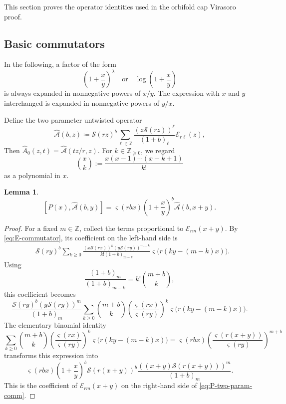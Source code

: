 \documentclass[letterpaper,12pt]{amsart}
\newtheorem{lem}[thm]{Lemma}
\theoremstyle{definition}
\newcommand{\Scal}{\mathcal S}
\newcommand{\Ecal}{\mathcal E}
\newcommand{\Z}{\mathbb Z}
\newcommand{\vars}{\varsigma}
\numberwithin{equation}{section}
\begin{document}
This section proves the operator identities used in the orbifold cap Virasoro proof. 


\subsection{Basic commutators}
In the following, a factor
of the form
\[
  \left(1+\frac{x}{y}\right)^\lambda
  \quad\text{or}\quad
  \log\left(1+\frac{x}{y}\right)
\]
is always expanded in nonnegative powers of \(x/y\).  The expression with \(x\)
and \(y\) interchanged is expanded in nonnegative powers of \(y/x\).

Define the two parameter untwisted operator
\[
  \widehat {\mathcal{A}}(b,z)
\coloneqq \Scal(rz)^b\sum_{\ell\in\Z}\frac{(z\Scal(rz))^\ell}{(1+b)_\ell}\Ecal_{r\ell}(z),
  \label{eq:two-param-a0}
\]
Then \(\widehat A_0(z,t)=\widehat {\mathcal{A}}(tz/r,z)\). For
\(k\in\mathbb Z_{\geq0}\), we regard
\[
  \binom{x}{k}
  :=
  \frac{x(x-1)\cdots(x-k+1)}{k!}
\]
as a polynomial in \(x\).


\begin{lem}\label{lem:P-comm-two-param}
\begin{equation}\label{eq:P-two-param-comm}
  [P(x),\widehat {\mathcal{A}}(b,y)]
  =\vars(rbx)\left(1+\frac{x}{y}\right)^b\widehat {\mathcal{A}}(b,x+y).
\end{equation}
\end{lem}
\begin{proof}
For a fixed \(m\in\Z\), collect the terms proportional to
\(\Ecal_{rm}(x+y)\). By \eqref{eq:E-commutator}, its coefficient on the left-hand side is
\begin{align*}
  &\Scal(ry)^b
  \sum_{k\ge0}
  \frac{(x\Scal(rx))^k(y\Scal(ry))^{m-k}}
  {k!(1+b)_{m-k}}
  \vars\bigl(r(ky-(m-k)x)\bigr).
\end{align*}
Using
\begin{equation}\label{eq:pochhammer-binomial}
  \frac{(1+b)_m}{(1+b)_{m-k}}=k!\binom{m+b}{k},  
\end{equation}
this coefficient becomes
\[
  \frac{\Scal(ry)^b(y\Scal(ry))^m}{(1+b)_m}
  \sum_{k\geq0}
  \binom{m+b}{k}
  \left(\frac{\vars(rx)}{\vars(ry)}\right)^k
  \vars\bigl(r(ky-(m-k)x)\bigr).
\]
The elementary binomial identity
\[
  \sum_{k\geq0}
  \binom{m+b}{k}
  \left(\frac{\vars(rx)}{\vars(ry)}\right)^k
  \vars\bigl(r(ky-(m-k)x)\bigr)
  =
  \vars(rbx)
  \left(
    \frac{\vars(r(x+y))}{\vars(ry)}
  \right)^{m+b}
\]
transforms this expression into
\[
  \vars(rbx)
  \left(1+\frac{x}{y}\right)^b
  \Scal(r(x+y))^b
  \frac{((x+y)\Scal(r(x+y)))^m}{(1+b)_m}.
\]
This is the coefficient of \(\Ecal_{rm}(x+y)\) on the right-hand side of
\eqref{eq:P-two-param-comm}.
\end{proof}
\end{document}
